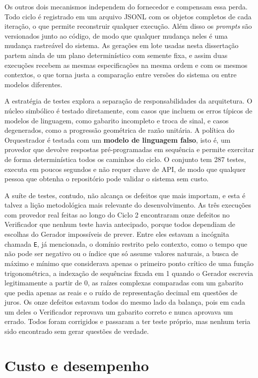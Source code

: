 Os outros dois mecanismos independem do fornecedor e compensam essa perda. Todo ciclo é registrado
em um arquivo JSONL com os objetos completos de cada iteração, o que permite reconstruir qualquer
execução. Além disso os \emph{prompts} são versionados junto ao código, de modo que qualquer
mudança neles é uma mudança rastreável do sistema. As gerações em lote usadas nesta dissertação
partem ainda de um plano determinístico com semente fixa, e assim duas execuções recebem as mesmas
especificações na mesma ordem e com os mesmos contextos, o que torna justa a comparação entre
versões do sistema ou entre modelos diferentes.

A estratégia de testes explora a separação de responsabilidades da arquitetura. O núcleo simbólico
é testado diretamente, com casos que incluem os erros típicos de modelos de linguagem, como gabarito
incompleto e troca de sinal, e casos degenerados, como a progressão geométrica de razão unitária. A
política do Orquestrador é testada com um \textbf{modelo de linguagem falso}, isto é, um provedor
que devolve respostas pré-programadas em sequência e permite exercitar de forma determinística
todos os caminhos do ciclo. O conjunto tem 287 testes, executa em poucos segundos e não requer
chave de API, de modo que qualquer pessoa que obtenha o repositório pode validar o sistema sem
custo.

A suíte de testes, contudo, não alcança os defeitos que mais importam, e esta é talvez a lição
metodológica mais relevante do desenvolvimento. As três execuções com provedor real feitas ao longo
do Ciclo 2 encontraram onze defeitos no Verificador que nenhum teste havia antecipado, porque todos
dependiam de escolhas do Gerador impossíveis de prever. Entre eles estavam a incógnita chamada
\texttt{E}, já mencionada, o domínio restrito pelo contexto, como o tempo que não pode ser negativo
ou o índice que só assume valores naturais, a busca de máximo e mínimo que considerava apenas o
primeiro ponto crítico de uma função trigonométrica, a indexação de sequências fixada em 1 quando o
Gerador escrevia legitimamente a partir de 0, as raízes complexas comparadas com um gabarito que
pedia apenas as reais e o ruído de representação decimal em questões de juros. Os onze defeitos
estavam todos do mesmo lado da balança, pois em cada um deles o Verificador reprovava um gabarito
correto e nunca aprovava um errado. Todos foram corrigidos e passaram a ter teste próprio, mas
nenhum teria sido encontrado sem gerar questões de verdade.

\section{Custo e desempenho}
\label{sec:custo}

